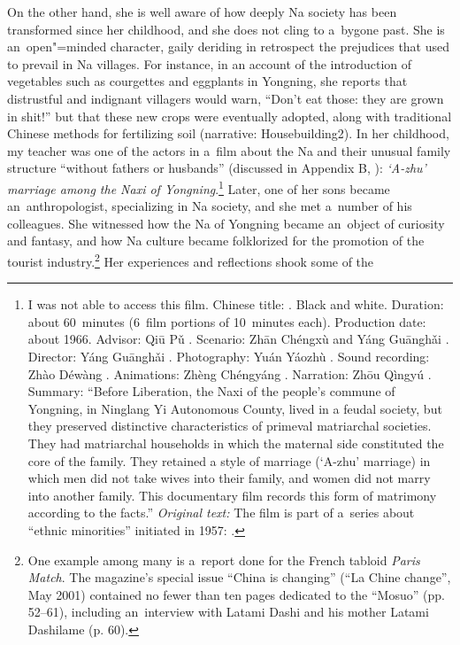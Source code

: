 On the other hand, she is well aware of how deeply Na society has been transformed since her childhood, and she does not cling to a~bygone past. She is an~open"=minded character,
gaily deriding in retrospect the prejudices that used to prevail in Na villages. For instance, in an account of the introduction of vegetables
such as courgettes and eggplants in Yongning, she reports that distrustful and indignant villagers would warn, “Don’t eat those: they are grown in shit!” but that these new crops were eventually adopted,
along with traditional Chinese methods for fertilizing soil (narrative: Housebuilding2). In her childhood, my teacher was one of the
actors in a~film about the Na and their unusual family structure “without fathers or husbands” (discussed in Appendix B, ): \textit{‘A-zhu’
  marriage among the Naxi of Yongning}.\footnote{I was not able to access this film. Chinese title: {\kern-3pt}. Black and white. Duration: about 60~minutes (6~film portions of 10~minutes each). Production date: about 1966. Advisor: Qiū Pǔ
  . Scenario: Zhān Chéngxù  and Yáng Guānghǎi . Director: Yáng
  Guānghǎi . Photography: Yuán Yáozhù . Sound recording: Zhào Déwàng . 
  Animations: Zhèng Chéngyáng . Narration: Zhōu Qìngyú . Summary: “Before Liberation, the Naxi of the people's commune of Yongning, in Ninglang Yi Autonomous County, lived in a feudal society, but they preserved distinctive characteristics of primeval matriarchal societies. They had matriarchal households in which the maternal side constituted the core of the family. They retained a style of marriage (‘A-zhu’ marriage) in which men did not take wives into their family, and women did not marry into another family. This documentary film records this form of matrimony according to the facts.” \textit{Original text:}  The film is part of a~series about “ethnic minorities” initiated in 1957: .} Later, one of her sons became
an~anthropologist, specializing in Na society, and she met a~number of his
colleagues. She witnessed how the Na of Yongning became an~object of curiosity and fantasy, and
how Na culture became folklorized for the promotion of the tourist industry.\footnote{One example among many is a~report done for the {French} tabloid
  \textit{Paris Match}. The magazine's special issue “China is changing” (“La Chine change”, May 2001) contained no fewer
  than ten pages dedicated to the “Mosuo” (pp. 52--61), including an~interview with Latami Dashi and
  his mother Latami Dashilame (p. 60).} Her experiences and reflections shook some of the
